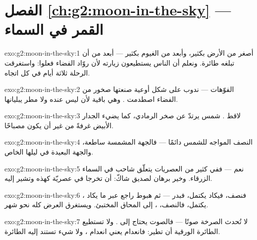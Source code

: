 \section*{الفصل \ref{ch:g2:moon-in-the-sky} --- القمر في السماء}

\begin{solution}{exo:g2:moon-in-the-sky:1}
أصغر من الأرض بكثير، وأبعد من الغيوم بكثير --- أبعد من أن تبلغه
طائرة. ونعلم أن الناس يستطيعون زيارته لأن روّاد الفضاء فعلوا:
واستغرقت الرحلة ثلاثة أيام في كل اتجاه.
\end{solution}

\begin{solution}{exo:g2:moon-in-the-sky:2}
الفوّهات --- ندوب على شكل أوعية صنعتها صخور من الفضاء اصطدمت
. وهي باقية لأن  ليس عنده  ولا مطر يبليانها.
\end{solution}

\begin{solution}{exo:g2:moon-in-the-sky:3}
لاقط .    شمس يرتدّ عن صخر  الرمادي، كما
يضيء الجدار الأبيض غرفةً من غير أن يكون مصباحًا.
\end{solution}

\begin{solution}{exo:g2:moon-in-the-sky:4}
النصف المواجه للشمس دائمًا --- فالجهة المشمسة ساطعة، والجهة
البعيدة في ليلها الخاص.
\end{solution}

\begin{solution}{exo:g2:moon-in-the-sky:5}
نعم --- ففي كثير من العصريات يتعلّق  شاحب في السماء الزرقاء.
وخير برهان لصديق شاكّ: أن تخرجا في عصريّة كهذه وتشير إليه.
\end{solution}

\begin{solution}{exo:g2:moon-in-the-sky:6}
، فنصف، فيكاد يكتمل، فبدر --- ثم هبوط راجع عبر ما يكاد
يكتمل، فالنصف، ، إلى المحاق المختبئ. ويستغرق العرض كله
نحو شهر.
\end{solution}

\begin{solution}{exo:g2:moon-in-the-sky:7}
لا تُحدث الصرخة صوتًا --- فالصوت يحتاج إلى . ولا تستطيع
الطائرة الورقية أن تطير: فانعدام  يعني انعدام ، ولا
شيء تستند إليه الطائرة.
\end{solution}

